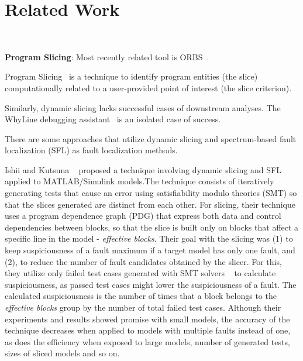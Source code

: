 \documentclass[sigplan,10pt,review,anonymous]{acmart}\settopmatter{printfolios=true,printccs=false,printacmref=false}
\begin{document}
\section{Related Work}

\\

\textbf{Program Slicing}: Most recently related tool is ORBS~\cite{DBLP:conf/scam/BinkleyGHIKY15}. 

Program Slicing~\cite{Weiser:1981:PS:800078.802557} is a technique to
identify program entities (the slice) computationally related to a user-provided point of
interest (the slice criterion).

Similarly, dynamic slicing lacks successful cases of downstream
analyses. The WhyLine debugging assistant~\cite{whyline-website} is an
isolated case of success.


There are some approaches that utilize dynamic slicing and
spectrum-based fault localization (SFL) as fault localization methods.

Ishii and Kutsuna ~\cite{li-huo-chen-zhong-feng-li-2013} proposed a
technique involving dynamic slicing and SFL applied to MATLAB/Simulink
models.The technique consists of iteratively
generating tests that cause an error using satisfiability modulo
theories (SMT) so that the slices generated are distinct from each
other.  For slicing, their technique uses a program dependence graph
(PDG) that express both data and control dependencies between blocks,
so that the slice is built only on blocks that affect a specific line
in the model - \textit{effective blocks}.  Their goal with the slicing
was (1) to keep suspiciousness of a fault maximum if a target model
has only one fault, and (2), to reduce the number of fault candidates
obtained by the slicer.  For this, they utilize only failed test cases
generated with SMT solvers ~\cite{peleska-vorobev-lapschies-2011} to
calculate suspiciousness, as passed test cases might lower the
suspiciousness of a fault.  The calculated suspiciousness is the
number of times that a block belongs to the \textit{effective blocks}
group by the number of total failed test cases.  Although their
experiments and results showed promise with small models, the accuracy
of the technique decreases when applied to models with multiple faults
instead of one, as does the efficiency when exposed to large models,
number of generated tests, sizes of sliced models and so on.
\end{document}
